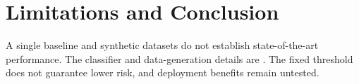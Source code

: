 \section{Limitations and Conclusion}
A single baseline and synthetic datasets do not establish state-of-the-art
performance. The classifier and data-generation details are
. The fixed threshold does not
guarantee lower risk, and deployment benefits remain untested.
\label{pw:main-end}
